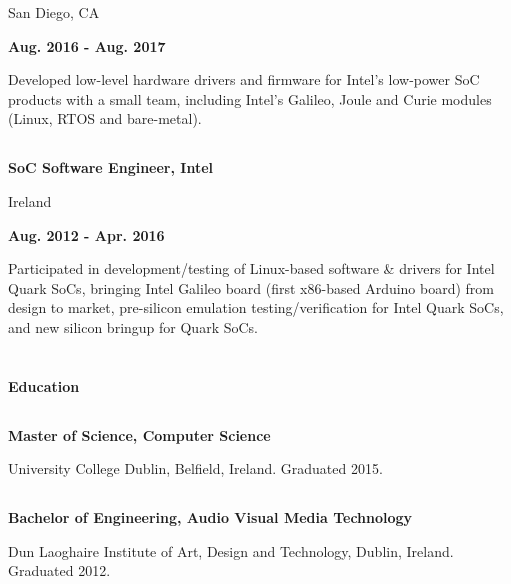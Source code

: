 \documentclass[6pt]{article}
\begin{document}
\begin{minipage}{35em}
\begin{minipage}{20em}
{San Diego, CA}
\end{minipage}
\hfill
\begin{minipage}{12em}
{\bfseries Aug. 2016 - Aug. 2017}
\end{minipage}
\break

Developed low-level hardware drivers and firmware for Intel's low-power SoC products
with a small team, including Intel's Galileo, Joule and Curie modules (Linux, RTOS and
bare-metal).

\dotfill

%
%
\subsection*{}
\begin{minipage}{20em}
{\bfseries SoC Software Engineer, Intel

Ireland}

\end{minipage}
\hfill
\begin{minipage}{12em}
{\bfseries \hfill Aug. 2012 - Apr. 2016}
\end{minipage}
\break

Participated in development/testing of Linux-based software \& drivers for Intel Quark SoCs,
bringing Intel Galileo board (first x86-based Arduino board) from design to market,
pre-silicon emulation testing/verification for Intel Quark SoCs, and new silicon bringup for Quark SoCs.

\section*{}
{\Large \bfseries Education}

\dotfill
\subsection*{}
{\bfseries Master of Science, Computer Science}

University College Dublin, Belfield, Ireland. Graduated 2015.
\subsection*{}
{\bfseries Bachelor of Engineering, Audio Visual Media Technology}

Dun Laoghaire Institute of Art, Design and Technology, Dublin, Ireland. Graduated 2012.

\end{minipage}
\end{document}
